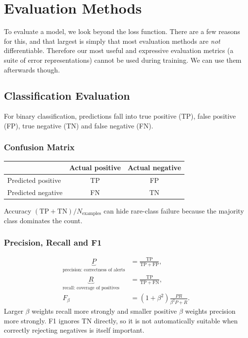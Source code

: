 \chapter{Evaluation Methods}
\label{chap:evaluation}
To evaluate a model, we look beyond the loss function. 
There are a few reasons for this, and that largest is simply that most evaluation methods are \textit{not} differentiable.
Therefore our most useful and expressive evaluation metrics (a suite of error representations) cannot be used during training.
We can use them afterwards though.

\section{Classification Evaluation}
\label{sec:evaluation-classification-evaluation-the-confusion-matrix}
For binary classification, predictions fall into true positive (TP), false positive (FP), true negative (TN) and false negative (FN).
\subsection{Confusion Matrix}
\begin{center}
    \small
    \begin{tabular}{@{}lcc@{}}
    \toprule
     & Actual positive & Actual negative \\
    \midrule
    Predicted positive & TP & FP \\
    Predicted negative & FN & TN \\
    \bottomrule
    \end{tabular}
\end{center}
Accuracy $(\mathrm{TP}+\mathrm{TN})/N_{\text{examples}}$ can hide rare-class failure because the majority class dominates the count.

\subsection{Precision, Recall and F1}
\label{sec:evaluation-precision-recall-and-f1}
\begin{align}
    \underbrace{P}_{\text{precision: correctness of alerts}}
    &=\frac{\mathrm{TP}}{\mathrm{TP}+\mathrm{FP}},\\
    \underbrace{R}_{\text{recall: coverage of positives}}
    &=\frac{\mathrm{TP}}{\mathrm{TP}+\mathrm{FN}},\\
    F_\beta
    &=(1+\beta^2)\frac{PR}{\beta^2P+R}.
\end{align}
Larger $\beta$ weights recall more strongly and smaller positive $\beta$ weights precision more strongly.
F1 ignores TN directly, so it is not automatically suitable when correctly rejecting negatives is itself important.

